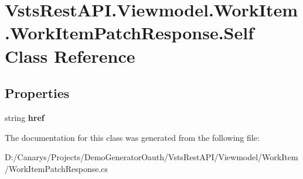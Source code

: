 \hypertarget{class_vsts_rest_a_p_i_1_1_viewmodel_1_1_work_item_1_1_work_item_patch_response_1_1_self}{}\section{Vsts\+Rest\+A\+P\+I.\+Viewmodel.\+Work\+Item.\+Work\+Item\+Patch\+Response.\+Self Class Reference}
\label{class_vsts_rest_a_p_i_1_1_viewmodel_1_1_work_item_1_1_work_item_patch_response_1_1_self}
\subsection*{Properties}
\begin{DoxyCompactItemize}
\item 
\mbox{\label{class_vsts_rest_a_p_i_1_1_viewmodel_1_1_work_item_1_1_work_item_patch_response_1_1_self_a63a134ea5cd73294e9ad4c4572491fe1}} 
string {\bfseries href}
\end{DoxyCompactItemize}


The documentation for this class was generated from the following file\+:\begin{DoxyCompactItemize}
\item 
D\+:/\+Canarys/\+Projects/\+Demo\+Generator\+Oauth/\+Vsts\+Rest\+A\+P\+I/\+Viewmodel/\+Work\+Item/Work\+Item\+Patch\+Response.\+cs\end{DoxyCompactItemize}
